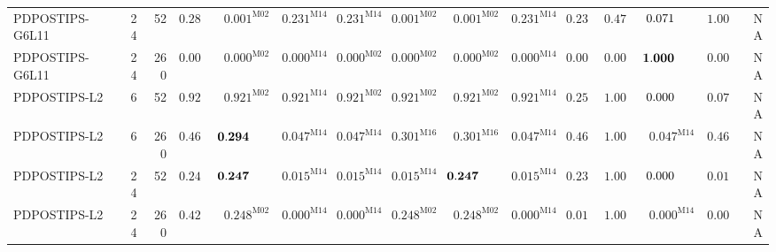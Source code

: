 \begin{longtable}{@{}lrrrrrrrrrrrrrr@{}}
PDPOSTIPS-G6L11 & 24 & 52 & $\mathbf{0.280}$ & $0.001^{\mathrm{M02}}$ & $\mathbf{0.231}^{\mathrm{M14}}$ & $\mathbf{0.231}^{\mathrm{M14}}$ & $0.001^{\mathrm{M02}}$ & $0.001^{\mathrm{M02}}$ & $\mathbf{0.231}^{\mathrm{M14}}$ & $\mathbf{0.231}$ & $\mathbf{0.477}$ & $0.071\hphantom{^{\mathrm{M00}}}$ & $\mathbf{1.000}$ & \textsc{NA} \\
PDPOSTIPS-G6L11 & 24 & 260 & $0.000$ & $0.000^{\mathrm{M02}}$ & $0.000^{\mathrm{M14}}$ & $0.000^{\mathrm{M02}}$ & $0.000^{\mathrm{M02}}$ & $0.000^{\mathrm{M02}}$ & $0.000^{\mathrm{M14}}$ & $0.000$ & $0.000$ & $\mathbf{1.000}\hphantom{^{\mathrm{M00}}}$ & $0.000$ & \textsc{NA} \\
PDPOSTIPS-L2 & 6 & 52 & $\mathbf{0.921}$ & $\mathbf{0.921}^{\mathrm{M02}}$ & $\mathbf{0.921}^{\mathrm{M14}}$ & $\mathbf{0.921}^{\mathrm{M02}}$ & $\mathbf{0.921}^{\mathrm{M02}}$ & $\mathbf{0.921}^{\mathrm{M02}}$ & $\mathbf{0.921}^{\mathrm{M14}}$ & $\mathbf{0.258}$ & $\mathbf{1.000}$ & $0.000\hphantom{^{\mathrm{M00}}}$ & $0.075$ & \textsc{NA} \\
PDPOSTIPS-L2 & 6 & 260 & $\mathbf{0.460}$ & $\mathbf{0.294}\hphantom{^{\mathrm{M00}}}$ & $0.047^{\mathrm{M14}}$ & $0.047^{\mathrm{M14}}$ & $\mathbf{0.301}^{\mathrm{M16}}$ & $\mathbf{0.301}^{\mathrm{M16}}$ & $0.047^{\mathrm{M14}}$ & $\mathbf{0.460}$ & $\mathbf{1.000}$ & $0.047^{\mathrm{M14}}$ & $\mathbf{0.460}$ & \textsc{NA} \\
PDPOSTIPS-L2 & 24 & 52 & $\mathbf{0.247}$ & $\mathbf{0.247}\hphantom{^{\mathrm{M00}}}$ & $0.015^{\mathrm{M14}}$ & $0.015^{\mathrm{M14}}$ & $0.015^{\mathrm{M14}}$ & $\mathbf{0.247}\hphantom{^{\mathrm{M00}}}$ & $0.015^{\mathrm{M14}}$ & $\mathbf{0.230}$ & $\mathbf{1.000}$ & $0.000\hphantom{^{\mathrm{M00}}}$ & $0.015$ & \textsc{NA} \\
PDPOSTIPS-L2 & 24 & 260 & $\mathbf{0.427}$ & $\mathbf{0.248}^{\mathrm{M02}}$ & $0.000^{\mathrm{M14}}$ & $0.000^{\mathrm{M14}}$ & $\mathbf{0.248}^{\mathrm{M02}}$ & $\mathbf{0.248}^{\mathrm{M02}}$ & $0.000^{\mathrm{M14}}$ & $0.012$ & $\mathbf{1.000}$ & $0.000^{\mathrm{M14}}$ & $0.002$ & \textsc{NA} \\
\end{longtable}

